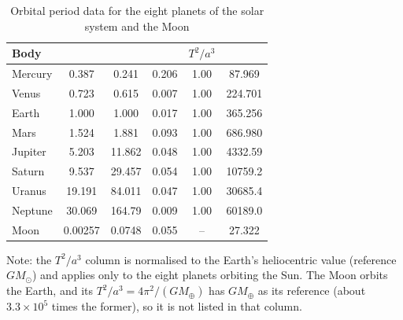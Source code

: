 \begin{table}[htbp]
    \centering
    \caption{Orbital period data for the eight planets of the solar system and the Moon}
    \label{tab:planetary_orbital_periods}
    \small
    \renewcommand{\arraystretch}{1.15}
    \begin{tabular}{@{}l S[table-format=2.3] S[table-format=3.3] S[table-format=1.2] S[table-format=1.3] S[table-format=5.4]@{}}
        \toprule
        Body &  &  &  &  &  \\
        \midrule
        Mercury & 0.387  & 0.241    & 0.206 & 1.00 & 87.969  \\
        Venus   & 0.723  & 0.615    & 0.007 & 1.00 & 224.701 \\
        Earth   & 1.000  & 1.000    & 0.017 & 1.00 & 365.256 \\
        Mars    & 1.524  & 1.881    & 0.093 & 1.00 & 686.980 \\
        Jupiter & 5.203  & 11.862   & 0.048 & 1.00 & 4332.59 \\
        Saturn  & 9.537  & 29.457   & 0.054 & 1.00 & 10759.2 \\
        Uranus  & 19.191 & 84.011   & 0.047 & 1.00 & 30685.4 \\
        Neptune & 30.069 & 164.79   & 0.009 & 1.00 & 60189.0 \\
        Moon    & 0.00257 & 0.0748 & 0.055 & {--} & 27.322  \\
        \bottomrule
    \end{tabular}

    \smallskip
    \footnotesize Note: the \(T^2/a^3\) column is normalised to the Earth's heliocentric value (reference \(GM_\odot\)) and applies only to the eight planets orbiting the Sun. The Moon orbits the Earth, and its \(T^2/a^3=4\pi^2/(GM_\oplus)\) has \(GM_\oplus\) as its reference (about \(3.3\times10^5\) times the former), so it is not listed in that column.
\end{table}

